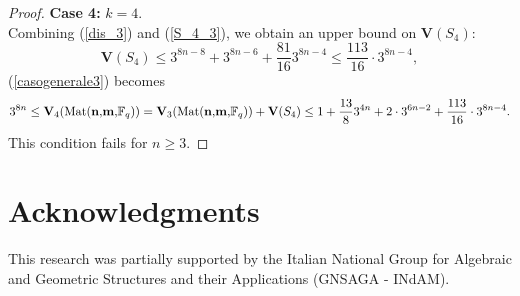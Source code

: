\documentclass[11pt]{amsart}
\theoremstyle{definition}
\begin{document}
\begin{proof}
\textbf{Case 4:} $k=4$.\\
Combining (\ref{dis_3}) and (\ref{S_4_3}), we obtain an upper bound on $\textbf{V}(S_4)$:
\[
\textbf{V}(S_4)\leq 3^{8n-8}+3^{8n-6}+\frac{81}{16}3^{8n-4}\leq \frac{113}{16} \cdot3^{8n-4},
\]
(\ref{casogenerale3}) becomes
\[
3^{8n}\leq\textbf{V}_4(\text{Mat(\textbf{n},\textbf{m},$\mathbb{F}_q$)})=\textbf{V}_3(\text{Mat(\textbf{n},\textbf{m},$\mathbb{F}_q$)})+\textbf{V}(S_4)\leq1+\frac{13}{8}3^{4n}+2\cdot3^{6n-2}+\frac{113}{16} \cdot3^{8n-4}.
\]
This condition fails for $n\geq3$.
\end{proof}

\section*{Acknowledgments}
This research was partially supported by the Italian National Group for Algebraic and Geometric Structures and their Applications (GNSAGA - INdAM).



\end{document}

